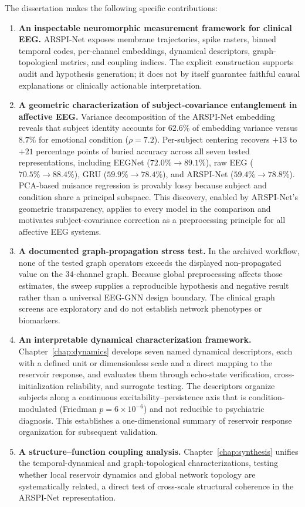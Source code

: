 The dissertation makes the following specific contributions:
\begin{enumerate}
    \item \textbf{An inspectable neuromorphic measurement framework for clinical EEG.} ARSPI-Net exposes membrane trajectories, spike rasters, binned temporal codes, per-channel embeddings, dynamical descriptors, graph-topological metrics, and coupling indices. The explicit construction supports audit and hypothesis generation; it does not by itself guarantee faithful causal explanations or clinically actionable interpretation.
    \item \textbf{A geometric characterization of subject-covariance entanglement in affective EEG.} Variance decomposition of the ARSPI-Net embedding reveals that subject identity accounts for $62.6\%$ of embedding variance versus $8.7\%$ for emotional condition ($\rho = 7.2$). Per-subject centering recovers $+13$ to $+21$ percentage points of buried accuracy across all seven tested representations, including EEGNet ($72.0\% \to 89.1\%$), raw EEG ($70.5\% \to 88.4\%$), GRU ($59.9\% \to 78.4\%$), and ARSPI-Net ($59.4\% \to 78.8\%$). PCA-based nuisance regression is provably lossy because subject and condition share a principal subspace. This discovery, enabled by ARSPI-Net's geometric transparency, applies to every model in the comparison and motivates subject-covariance correction as a preprocessing principle for all affective EEG systems.
    \item \textbf{A documented graph-propagation stress test.} In the archived workflow, none of the tested graph operators exceeds the displayed non-propagated value on the $34$-channel graph. Because global preprocessing affects those estimates, the sweep supplies a reproducible hypothesis and negative result rather than a universal EEG-GNN design boundary. The clinical graph screens are exploratory and do not establish network phenotypes or biomarkers.
    \item \textbf{An interpretable dynamical characterization framework.} Chapter~\ref{chap:dynamics} develops seven named dynamical descriptors, each with a defined unit or dimensionless scale and a direct mapping to the reservoir response, and evaluates them through echo-state verification, cross-initialization reliability, and surrogate testing. The descriptors organize subjects along a continuous excitability--persistence axis that is condition-modulated (Friedman $p = 6 \times 10^{-6}$) and not reducible to psychiatric diagnosis. This establishes a one-dimensional summary of reservoir response organization for subsequent validation.
    \item \textbf{A structure--function coupling analysis.} Chapter~\ref{chap:synthesis} unifies the temporal-dynamical and graph-topological characterizations, testing whether local reservoir dynamics and global network topology are systematically related, a direct test of cross-scale structural coherence in the ARSPI-Net representation.
\end{enumerate}

